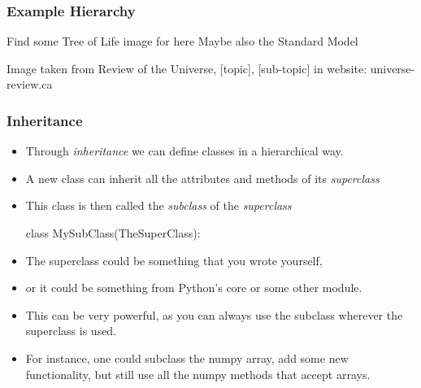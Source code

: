 \documentclass{beamer}
\begin{document}
\begin{frame}[fragile]
\frametitle{Example Hierarchy}
Find some Tree of Life image for here
Maybe also the Standard Model

Image taken from Review of the Universe, [topic], [sub-topic] in website: universe-review.ca

\end{frame}

\begin{frame}[fragile]
\frametitle{Inheritance}
\begin{itemize}
\item Through \emph{inheritance} we can define classes in a hierarchical way.
\item A new class can inherit all the attributes and methods of its \emph{superclass}
\item This class is then called the \emph{subclass} of the \emph{superclass}
\begin{code}
  class MySubClass(TheSuperClass):
\end{code}
\item The superclass could be something that you wrote yourself,
\item or it could be something from Python's core or some other module.
\item This can be very powerful, as you can always use the subclass wherever the superclass is used.
\item For instance, one could subclass the numpy array, add some new functionality, 
but still use all the numpy methods that accept arrays.

\end{itemize}


\end{frame}
\end{document}
